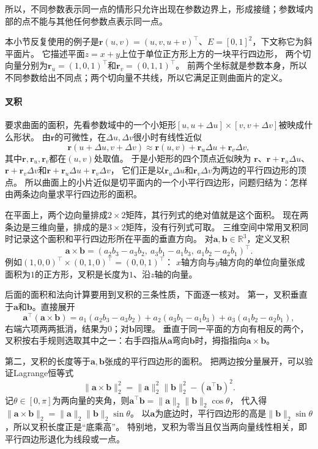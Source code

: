 所以，不同参数表示同一点的情形只允许出现在参数边界上，形成接缝；参数域内部的点不能与其他任何参数点表示同一点。

本小节反复使用的例子是$\bm r(u,v)=(u,v,u+v)^\top$、$E=[0,1]^2$，下文称它为斜平面片。
它描述平面$z=x+y$上位于单位正方形上方的一块平行四边形，
两个切向量分别为$\bm r_u=(1,0,1)^\top$和$\bm r_v=(0,1,1)^\top$。
前两个坐标就是参数本身，所以不同参数给出不同点；两个切向量不共线，所以它满足正则曲面片的定义。

\paragraph{叉积}

要求曲面的面积，先看参数域中的一个小矩形$[u,u+\Delta u]\times[v,v+\Delta v]$被映成什么形状。
由$\bm r$的可微性，在$\Delta u,\Delta v$很小时有线性近似
\[
 \bm r(u+\Delta u,v+\Delta v)\approx\bm r(u,v)+\bm r_u\Delta u+\bm r_v\Delta v,
\]
其中$\bm r,\bm r_u,\bm r_v$都在$(u,v)$处取值。
于是小矩形的四个顶点近似映为
$\bm r$、$\bm r+\bm r_u\Delta u$、$\bm r+\bm r_v\Delta v$和$\bm r+\bm r_u\Delta u+\bm r_v\Delta v$，
它们正是以$\bm r_u\Delta u$和$\bm r_v\Delta v$为两边的平行四边形的顶点。
所以曲面上的小片近似是切平面内的一个小平行四边形，问题归结为：怎样由两条边向量求平行四边形的面积。

在平面上，两个边向量排成$2\times2$矩阵，其行列式的绝对值就是这个面积。
现在两条边是三维向量，排成的是$3\times2$矩阵，没有行列式可取。
三维空间中常用叉积同时记录这个面积和平行四边形所在平面的垂直方向。
对$\bm a,\bm b\in\mathbb R^3$，定义叉积
\[
 \bm a\times\bm b
 =(a_2b_3-a_3b_2,\ a_3b_1-a_1b_3,\ a_1b_2-a_2b_1)^\top.
\]
例如$(1,0,0)^\top\times(0,1,0)^\top=(0,0,1)^\top$：
$x$轴方向与$y$轴方向的单位向量张成面积为$1$的正方形，叉积是长度为$1$、沿$z$轴的向量。

后面的面积和法向计算要用到叉积的三条性质，下面逐一核对。
第一，叉积垂直于$\bm a$和$\bm b$。直接展开
\[
 \bm a^\top(\bm a\times\bm b)
 =a_1(a_2b_3-a_3b_2)+a_2(a_3b_1-a_1b_3)+a_3(a_1b_2-a_2b_1),
\]
右端六项两两抵消，结果为$0$；对$\bm b$同理。
垂直于同一平面的方向有相反的两个，叉积按右手规则选取其中之一：右手四指从$\bm a$弯向$\bm b$时，拇指指向$\bm a\times\bm b$。

第二，叉积的长度等于$\bm a,\bm b$张成的平行四边形的面积。
把两边按分量展开，可以验证Lagrange恒等式
\[
 \lVert\bm a\times\bm b\rVert_2^2
 =\lVert\bm a\rVert_2^2\lVert\bm b\rVert_2^2-(\bm a^\top\bm b)^2.
\]
记$\theta\in[0,\pi]$为两向量的夹角，则$\bm a^\top\bm b=\lVert\bm a\rVert_2\lVert\bm b\rVert_2\cos\theta$，
代入得$\lVert\bm a\times\bm b\rVert_2=\lVert\bm a\rVert_2\lVert\bm b\rVert_2\sin\theta$。
以$\bm a$为底边时，平行四边形的高是$\lVert\bm b\rVert_2\sin\theta$，所以叉积长度正是“底乘高”。
特别地，叉积为零当且仅当两向量线性相关，即平行四边形退化为线段或一点。

